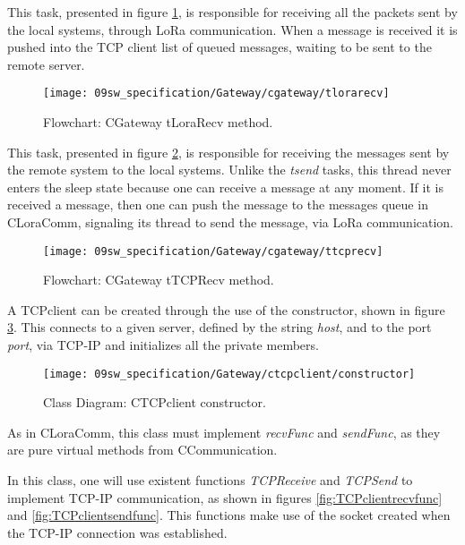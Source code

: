 \clearpage
This task, presented in figure \ref{fig:gwtLoraRecv}, is responsible for receiving all the packets sent by the local systems, through LoRa communication. When a message is received it is pushed into the TCP client list of queued messages, waiting to be sent to the remote server.

\begin{figure}[H]
	\centering
	\texttt{[image: 09sw\_specification/Gateway/cgateway/tlorarecv]}
	\caption{Flowchart: CGateway tLoraRecv method.}
	\label{fig:gwtLoraRecv}
\end{figure}

\clearpage
This task, presented in figure \ref{fig:gwtTCPRecv}, is responsible for receiving the messages sent by the remote system to the local systems. Unlike the \textit{tsend} tasks, this thread never enters the sleep state because one can receive a message at any moment. If it is received a message, then one can push the message to the messages queue in CLoraComm, signaling its thread to send the message, via LoRa communication.

\begin{figure}[H]
	\centering
	\texttt{[image: 09sw\_specification/Gateway/cgateway/ttcprecv]}
	\caption{Flowchart: CGateway tTCPRecv method.}
	\label{fig:gwtTCPRecv}
\end{figure}

\clearpage
{}

A TCPclient can be created through the use of the constructor, shown in figure \ref{fig:TCPclientconstructor}. This connects to a given server, defined by the string \textit{host}, and to the port \textit{port}, via TCP-IP and initializes all the private members.

\begin{figure}[H]
	\centering
	\texttt{[image: 09sw\_specification/Gateway/ctcpclient/constructor]}
	\caption{Class Diagram: CTCPclient constructor.}
	\label{fig:TCPclientconstructor}
\end{figure}

As in CLoraComm, this class must implement \textit{recvFunc} and \textit{sendFunc}, as they are pure virtual methods from CCommunication. 

In this class, one will use existent functions \textit{TCPReceive} and \textit{TCPSend} to implement TCP-IP communication, as shown in figures \ref{fig:TCPclientrecvfunc} and \ref{fig:TCPclientsendfunc}. This functions make use of the socket created when the TCP-IP connection was established.

